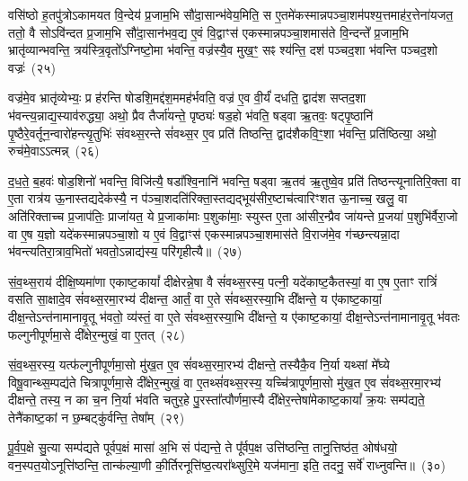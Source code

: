 {\anuvakamend[{अ॒ति॒रा॒त्र ओज॑स्ये॒व षट्त्रिꣳ॑शच्च}]}%

वसि॑ष्ठो ह॒तपु॑त्रो\-ऽकामयत वि॒न्देय॑ प्र॒जाम॒भि सौ॑दा॒सान्भ॑वेय॒मिति॒ स ए॒तमे॑कस्मान्नपञ्चा॒शम॑पश्य॒त्तमाह॑र॒त्तेना॑यजत॒ ततो॒ वै सो\-ऽवि॑न्दत प्र॒जाम॒भि सौ॑दा॒सान॑भव॒द्य ए॒वं वि॒द्वाꣳस॑ एकस्मान्नपञ्चा॒शमास॑ते वि॒न्दन्ते᳚ प्र॒जाम॒भि भ्रातृ॑व्यान्भवन्ति॒ त्रय॑स्त्रि॒वृतो᳚\-ऽग्निष्टो॒मा भ॑वन्ति॒ वज्र॑स्यै॒व मुख॒ꣳ॒ सꣴ श्य॑न्ति॒ दश॑ पञ्चद॒शा भ॑वन्ति पञ्चद॒शो वज्रः॑~(२५)

वज्र॑मे॒व भ्रातृ॑व्येभ्यः॒ प्र ह॑रन्ति षोडशि॒मद्द॑श॒ममह॑र्भवति॒ वज्र॑ ए॒व वी॒र्यं॑ दधति॒ द्वाद॑श सप्तद॒शा भ॑वन्त्य॒न्नाद्य॒स्याव॑रुद्ध्या॒ अथो॒ प्रैव तैर्जा॑यन्ते॒ पृष्ठ्यः॑ षड॒हो भ॑वति॒ षड्वा ऋ॒तवः॒ षट्पृ॒ष्ठानि॑ पृ॒ष्ठैरे॒वर्तून॒न्वारो॑हन्त्यृ॒तुभिः॑ संवथ्स॒रन्ते सं॑वथ्स॒र ए॒व प्रति॑ तिष्ठन्ति॒ द्वाद॑शैकवि॒ꣳ॒शा भ॑वन्ति॒ प्रति॑ष्ठित्या॒ अथो॒ रुच॑मे॒वा\-ऽऽ\-त्मन्न्~(२६)

द॒ध॒ते॒ ब॒हवः॑ षोड॒शिनो॑ भवन्ति॒ विजि॑त्यै॒ षडा᳚श्वि॒नानि॑ भवन्ति॒ षड्वा ऋ॒तव॑ ऋ॒तुष्वे॒व प्रति॑ तिष्ठन्त्यूनातिरि॒क्ता वा ए॒ता रात्र॑य ऊ॒नास्तद्यदेक॑स्यै॒ न प॑ञ्चा॒शदति॑रिक्ता॒स्तद्यद्भूय॑सीर॒ष्टाच॑त्वारिꣳशत ऊ॒नाच्च॒ खलु॒ वा अति॑रिक्ताच्च प्र॒जा\-प॑तिः॒ प्राजा॑यत॒ ये प्र॒जाका॑माः प॒शुका॑माः॒ स्युस्त ए॒ता आ॑सीर॒न्प्रैव जा॑यन्ते प्र॒जया॑ प॒शुभि॑र्वैरा॒जो वा ए॒ष य॒ज्ञो यदे॑कस्मान्नपञ्चा॒शो य ए॒वं वि॒द्वाꣳस॑ एकस्मान्नपञ्चा॒शमास॑ते वि॒राज॑मे॒व ग॑च्छन्त्यन्ना॒दा भ॑वन्त्यतिरा॒त्राव॒भितो॑ भवतो॒\-ऽन्नाद्य॑स्य॒ परि॑गृहीत्यै॥~(२७)

{\anuvakamend[{वज्र॑ आ॒त्मन्प्र॒जया॒ द्वाविꣳ॑शतिश्च}]}%

सं॒व॒थ्स॒राय॑ दीक्षि॒ष्यमा॑णा एकाष्ट॒कायां᳚ दीक्षेरन्ने॒षा वै सं॑वथ्स॒रस्य॒ पत्नी॒ यदे॑काष्ट॒कैतस्यां॒ वा ए॒ष ए॒ताꣳ रात्रिं॑ वसति सा॒क्षादे॒व सं॑वथ्स॒रमा॒रभ्य॑ दीक्षन्त॒ आर्तं॒ वा ए॒ते सं॑वथ्स॒रस्या॒भि दी᳚क्षन्ते॒ य ए॑काष्ट॒कायां॒ दीक्ष॒न्ते\-ऽन्त॑नामानावृ॒तू भ॑वतो॒ व्य॑स्तं॒ वा ए॒ते सं॑वथ्स॒रस्या॒भि दी᳚क्षन्ते॒ य ए॑काष्ट॒कायां॒ दीक्ष॒न्ते\-ऽन्त॑नामानावृ॒तू भ॑वतः फल्गुनीपूर्णमा॒से दी᳚क्षेर॒न्मुखं॒ वा ए॒तत्~(२८)

सं॒व॒थ्स॒रस्य॒ यत्फ॑ल्गुनीपूर्णमा॒सो मु॑ख॒त ए॒व सं॑वथ्स॒रमा॒रभ्य॑ दीक्षन्ते॒ तस्यैकै॒व नि॒र्या यथ्सां मे᳚घ्ये विषू॒वान्थ्स॒म्पद्य॑ते चित्रापूर्णमा॒से दी᳚क्षेर॒न्मुखं॒ वा ए॒तथ्सं॑वथ्स॒रस्य॒ यच्चि॑त्रापूर्णमा॒सो मु॑ख॒त ए॒व सं॑वथ्स॒रमा॒रभ्य॑ दीक्षन्ते॒ तस्य॒ न का च॒न नि॒र्या भ॑वति चतुर॒हे पु॒रस्ता᳚त्पौर्णमा॒स्यै दी᳚क्षेर॒न्तेषा॑मेकाष्ट॒कायां᳚ क्र॒यः सम्प॑द्यते॒ तेनै॑काष्ट॒कां न छ॒म्बट्कु॑र्वन्ति॒ तेषा᳚म्~(२९)

पू॒र्व॒प॒क्षे सु॒त्या सम्प॑द्यते पूर्वप॒क्षं मासा॑ अ॒भि सं प॑द्यन्ते॒ ते पू᳚र्वप॒क्ष उत्ति॑ष्ठन्ति॒ तानु॒त्तिष्ठ॑त॒ ओष॑धयो॒ वन॒स्पत॒यो\-ऽनूत्ति॑ष्ठन्ति॒ तान्क॑ल्या॒णी की॒र्तिरनूत्ति॑ष्ठ॒त्यरा᳚थ्सुरि॒मे यज॑माना॒ इति॒ तदनु॒ सर्वे॑ राध्नुवन्ति॥~(३०)


